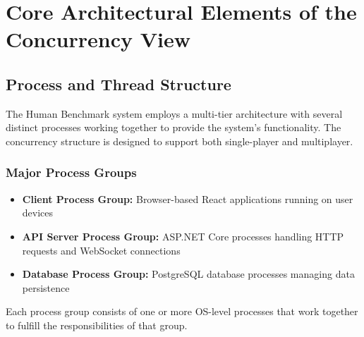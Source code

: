 \section{Core Architectural Elements of the Concurrency View}

\subsection{Process and Thread Structure}

The Human Benchmark system employs a multi-tier architecture with several distinct processes
 working together to provide the system's functionality. The concurrency structure is designed to 
 support both single-player and multiplayer.

\subsubsection{Major Process Groups}

\begin{itemize}
    \item \textbf{Client Process Group:} Browser-based React applications running on user devices
    \item \textbf{API Server Process Group:} ASP.NET Core processes handling HTTP requests and WebSocket connections
    \item \textbf{Database Process Group:} PostgreSQL database processes managing data persistence
\end{itemize}

Each process group consists of one or more OS-level processes that work together to fulfill the responsibilities of that group.


